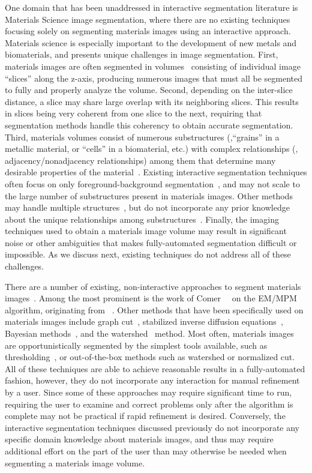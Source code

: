 \documentclass[]{spie}  %
\begin{document}
One domain that has been unaddressed in interactive segmentation
literature is Materials Science image segmentation, where there are no
existing techniques focusing solely on segmenting materials images
using an interactive approach.  Materials science is especially
important to the development of new metals and biomaterials, and
presents unique challenges in image segmentation.  First, materials
images are often segmented in volumes~\cite{ibrahim:91} consisting of
individual image ``slices'' along the z-axis, producing numerous
images that must all be segmented to fully and properly analyze the
volume.  Second, depending on the inter-slice distance, a slice may
share large overlap with its neighboring slices.  This results in
slices being very coherent from one slice to the next, requiring that
segmentation methods handle this coherency to obtain accurate
segmentation.  Third, materials volumes consist of numerous
substructures (\eg,``grains'' in a metallic material, or ``cells'' in
a biomaterial, etc.) with complex relationships (\eg,
adjacency/nonadjacency relationships) among them that determine many
desirable properties of the material~\cite{swiler:95, rollett:04}.
Existing interactive segmentation techniques often focus on only
foreground-background segmentation~\cite{rother:04, boykov:01b}, and
may not scale to the large number of substructures present in
materials images.  Other methods may handle multiple
structures~\cite{straehle:11, straehle:12}, but do not incorporate any
prior knowledge about the unique relationships among
substructures~\cite{reed:06, tan:04}.  Finally, the imaging techniques
used to obtain a materials image volume may result in significant
noise or other ambiguities that makes fully-automated segmentation
difficult or impossible.  As we discuss next, existing techniques do
not address all of these challenges.

There are a number of existing, non-interactive approaches to segment
materials images~\cite{chuang:08, simmons:09}.  Among the most
prominent is the work of Comer~\etal~\cite{comer:94, comer:00} on the
EM/MPM algorithm, originating from~\cite{marroquin:87} .  Other
methods that have been specifically used on materials images include
graph cut~\cite{landis:11, waggoner:11}, stabilized inverse diffusion
equations~\cite{huffman:08}, Bayesian methods~\cite{comer:11,
  simmons:08}, and the watershed~\cite{liq:07} method.  Most often,
materials images are opportunistically segmented by the simplest tools
available, such as thresholding~\cite{gonzalez:08,shapiro:01}, or
out-of-the-box methods such as watershed or normalized cut.  All of
these techniques are able to achieve reasonable results in a
fully-automated fashion, however, they do not incorporate any
interaction for manual refinement by a user.  Since some of these
approaches may require significant time to run, requiring the user to
examine and correct problems only after the algorithm is complete may
not be practical if rapid refinement is desired.  Conversely, the
interactive segmentation techniques discussed previously do not
incorporate any specific domain knowledge about materials images, and
thus may require additional effort on the part of the user than may
otherwise be needed when segmenting a materials image volume.
\end{document}
